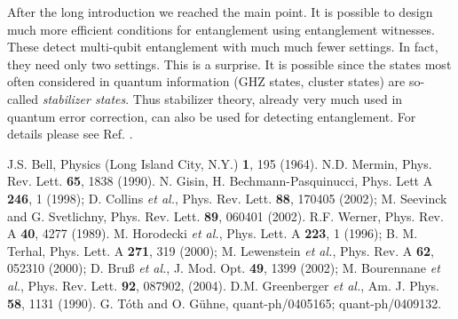 \documentclass[pra,amsmath,amssymb]{revtex4}
\begin{document}
After the long introduction we reached the main point. It is
possible to design much more efficient 
conditions for entanglement using entanglement witnesses.
These detect multi-qubit entanglement with much much fewer
settings. In fact, they need only two settings. This is a
surprise. It is possible since the states most often considered in
quantum information (GHZ states, cluster states) are so-called
{\it stabilizer states}. Thus stabilizer theory, already very much used
in quantum error correction, can also be used for detecting
entanglement. For details please see Ref. \cite{TG04}.
\begin{thebibliography}{99}
 J.S. Bell, Physics (Long Island City, N.Y.) {\bf 1}, 195 (1964).
 N.D. Mermin, Phys. Rev. Lett. {\bf 65}, 1838 (1990).
N. Gisin, H. Bechmann-Pasquinucci, Phys. Lett A {\bf 246}, 1
(1998); D. Collins {\it et al.}, Phys. Rev. Lett. {\bf 88}, 170405
(2002); M. Seevinck and G. Svetlichny, 
Phys. Rev. Lett. {\bf 89}, 060401 (2002).
 R.F. Werner, Phys. Rev. A {\bf 40}, 4277 (1989).
 M. Horodecki {\it et al.},
Phys. Lett. A {\bf 223}, 1 (1996);
B. M. Terhal, Phys. Lett. A {\bf 271}, 319 (2000);
M. Lewenstein {\it et al.}, Phys. Rev. A {\bf 62}, 052310 (2000);
D. Bru{\ss} {\it et al.}, J. Mod. Opt. {\bf 49}, 1399 (2002);
 M. Bourennane {\it et al.},
Phys. Rev. Lett. {\bf 92}, 087902, (2004).
 D.M. Greenberger {\it et al.},
Am. J. Phys. {\bf 58}, 1131 (1990).
 G. T\'oth and O. G\"uhne, quant-ph/0405165;
quant-ph/0409132.
\end{thebibliography}
\end{document}
